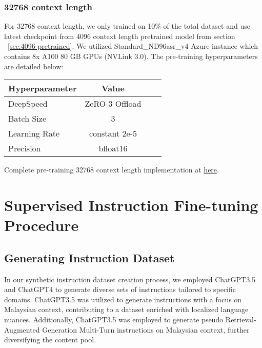 \documentclass{article}
\begin{document}
\subsubsection{32768 context length}\label{sec:32768-pretrained}

For 32768 context length, we only trained on 10\% of the total dataset and use latest checkpoint from 4096 context length pretrained model from section ~\ref{sec:4096-pretrained}. We utilized Standard\_ND96asr\_v4 Azure instance which contains 8x A100 80 GB GPUs (NVLink 3.0). The pre-training hyperparameters are detailed below:

\begin{table}[h]
  \centering
  \begin{tabular}{lccl}
    \hline
    \textbf{Hyperparameter} & \textbf{Value} \\
    \hline
    DeepSpeed               & ZeRO-3 Offload \\
    Batch Size              & 3              \\
    Learning Rate           & constant 2e-5  \\
    Precision               & bfloat16       \\
    \hline
  \end{tabular}
\end{table}

Complete pre-training 32768 context length implementation at \href{https://github.com/mesolitica/malaya/tree/5.1/session/mistral#7b-32768-context-length}{here}.


\section{Supervised Instruction Fine-tuning Procedure}

\subsection{Generating Instruction Dataset}

In our synthetic instruction dataset creation process, we employed ChatGPT3.5 and ChatGPT4 to generate diverse sets of instructions tailored to specific domains. ChatGPT3.5 was utilized to generate instructions with a focus on Malaysian context, contributing to a dataset enriched with localized language nuances. Additionally, ChatGPT3.5 was employed to generate pseudo Retrieval-Augmented Generation Multi-Turn instructions on Malaysian context, further diversifying the content pool.
\end{document}
